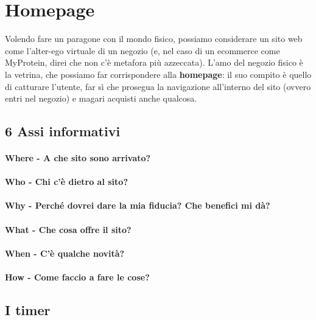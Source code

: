 \section{Homepage}
Volendo fare un paragone con il mondo fisico, possiamo considerare un sito web come l'alter-ego virtuale di un negozio (e, nel caso di un ecommerce come MyProtein, direi che non c'è metafora più azzeccata). L'amo del negozio fisico è la vetrina, che possiamo far corrispondere alla \textbf{homepage}: il suo compito è quello di catturare l'utente, far sì che prosegua la navigazione all'interno del sito (ovvero entri nel negozio) e  magari acquisti anche qualcosa.
\subsection{6 Assi informativi}

\paragraph{Where - A che sito sono arrivato?}

\paragraph{Who - Chi c'è dietro al sito?}

\paragraph{Why - Perché dovrei dare la mia fiducia? Che benefici mi dà?}

\paragraph{What - Che cosa offre il sito?}

\paragraph{When - C'è qualche novità?}

\paragraph{How - Come faccio a fare le cose?}

\subsection{I timer}
